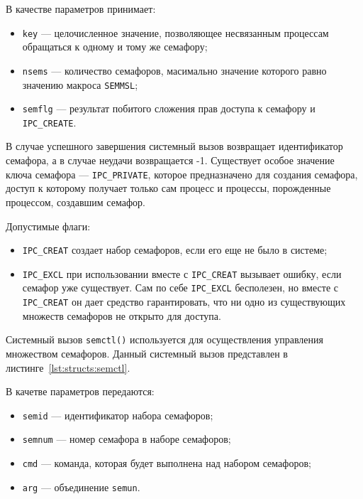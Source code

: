

В качестве параметров принимает:
\begin{itemize}
	\item \texttt{key} --- целочисленное значение, позволяющее несвязанным процессам обращаться к одному и тому же семафору;
	\item \texttt{nsems} --- количество семафоров, масимально значение которого равно значению макроса \texttt{SEMMSL};
	\item \texttt{semflg} --- результат побитого сложения прав доступа к семафору и \texttt{IPC\_CREATE}.
\end{itemize}

В случае успешного завершения системный вызов возвращает идентификатор семафора, а в случае неудачи возвращается -1. 
Существует особое значение ключа семафора --- \texttt{IPC\_PRIVATE}, которое предназначено для создания семафора, доступ к которому получает только сам процесс и процессы, порожденные процессом, создавшим семафор.

Допустимые флаги:
\begin{itemize}
	\item \texttt{IPC\_CREAT} создает набор семафоров, если его еще не было в системе;
	\item \texttt{IPC\_EXCL} при использовании вместе с \texttt{IPC\_CREAT} вызывает ошибку, если семафор уже
	существует. Сам по себе \texttt{IPC\_EXCL} бесполезен, но вместе с \texttt{IPC\_CREAT} он дает средство
	гарантировать, что ни одно из существующих множеств семафоров не открыто для доступа.
\end{itemize}

Системный вызов \texttt{semctl()} используется для осуществления управления множеством семафоров. 
Данный системный вызов представлен в листинге~\ref{lst:structs:semctl}.



В качетве параметров передаются:
\begin{itemize}
	\item \texttt{semid} ---  идентификатор набора семафоров;
	\item \texttt{semnum} --- номер семафора в наборе семафоров;
	\item \texttt{cmd} --- команда, которая будет выполнена над набором семафоров;
	\item \texttt{arg} --- объединение \texttt{semun}.
\end{itemize}


